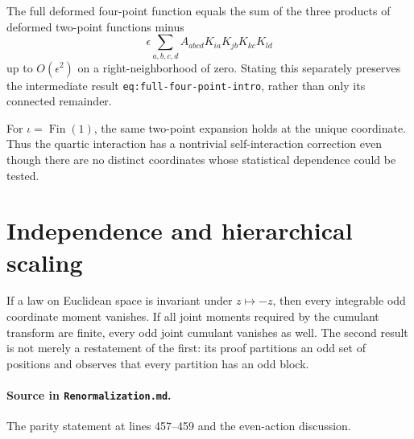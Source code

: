 \begin{theorem}
\label{thm:renorm:quarticFullFourPoint}
The full deformed four-point function equals the sum of the three products of deformed two-point
functions minus
\[
 \epsilon\sum_{a,b,c,d}A_{abcd}K_{i a}K_{j b}K_{k c}K_{l d}
\]
up to $O(\epsilon^2)$ on a right-neighborhood of zero.  Stating this separately preserves the
intermediate result \texttt{eq:full-four-point-intro}, rather than only its connected remainder.
\end{theorem}

\begin{corollary}
\label{cor:renorm:oneDimensionalSelfInteraction}
For $\iota=\operatorname{Fin}(1)$, the same two-point expansion holds at the unique coordinate.
Thus the quartic interaction has a nontrivial self-interaction correction even though there are no
distinct coordinates whose statistical dependence could be tested.
\end{corollary}

\section{Independence and hierarchical scaling}

\begin{theorem}
\label{thm:renorm:parityConsequences}
If a law on Euclidean space is invariant under $z\mapsto-z$, then every integrable odd coordinate
moment vanishes.  If all joint moments required by the cumulant transform are finite, every odd
joint cumulant vanishes as well.  The second result is not merely a restatement of the first: its
proof partitions an odd set of positions and observes that every partition has an odd block.

\paragraph{Source in \texttt{Renormalization.md}.}
The parity statement at lines 457--459 and the even-action discussion.
\end{theorem}

